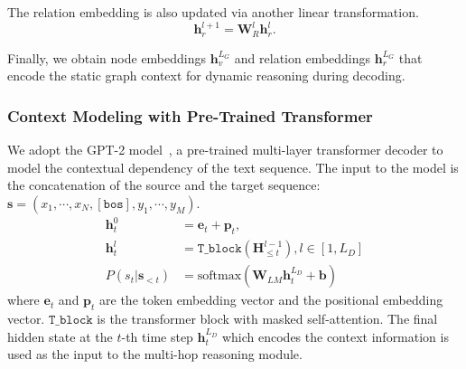 \documentclass[11pt,a4paper]{article}
\begin{document}
The relation embedding is also updated via another linear transformation.
\begin{equation}
    \bm{h}_r^{l+1}=\mathbf{W}_{R}^l \bm{h}_r^l.
\end{equation}

Finally, we obtain node embeddings $\bm{h}^{L_G}_v$ and relation embeddings $\bm{h}^{L_G}_r$ that encode the static graph context for dynamic reasoning during decoding. %


\subsubsection{Context Modeling with Pre-Trained Transformer}\label{sec:text}
We adopt the GPT-2 model~\citep{Radford2019LanguageMA}, a pre-trained multi-layer transformer decoder to model the contextual dependency of the text sequence. The input to the model is the concatenation of the source and the target sequence: $\bm{s} = (x_1,\cdots,x_N,[\texttt{bos}],y_1,\cdots,y_M)$.
\begin{align}
    \bm{h}_t^0 &= \bm{e}_t + \bm{p}_t, \\
    \bm{h}_t^l &= \texttt{T\_block}(\mathbf{H}_{\le t}^{l-1}), l\in[1,L_D] \\
    \label{equ:lm}
    P(s_t|\bm{s}_{<t}) &= \text{softmax}(\mathbf{W}_{LM}\bm{h}_t^{L_D} + \bm{b})%
\end{align}
where $\bm{e}_t$ and $\bm{p}_t$ are the token embedding vector and the positional embedding vector.
$\texttt{T\_block}$ is the transformer block with masked self-attention. 
The final hidden state at the $t$-th time step $\bm{h}_t^{L_D}$ which encodes the context information is used as the input to the multi-hop reasoning module.
\end{document}
